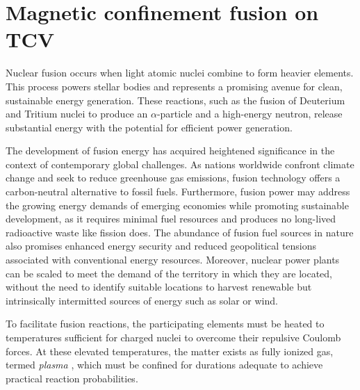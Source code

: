 \section{Magnetic confinement fusion on TCV}
\label{sec:tcv}
Nuclear fusion occurs when light atomic nuclei combine to form heavier elements. This process powers stellar bodies and represents a promising avenue for clean, sustainable energy generation. These reactions, such as the fusion of Deuterium and Tritium nuclei to produce an $\alpha$-particle and a high-energy neutron, release substantial energy with the potential for efficient power generation.

The development of fusion energy has acquired heightened significance in the context of contemporary global challenges. As nations worldwide confront climate change and seek to reduce greenhouse gas emissions, fusion technology offers a carbon-neutral alternative to fossil fuels. Furthermore, fusion power may address the growing energy demands of emerging economies while promoting sustainable development, as it requires minimal fuel resources and produces no long-lived radioactive waste like fission does. The abundance of fusion fuel sources in nature also promises enhanced energy security and reduced geopolitical tensions associated with conventional energy resources. Moreover, nuclear power plants can be scaled to meet the demand of the territory in which they are located, without the need to identify suitable locations to harvest renewable but intrinsically intermitted sources of energy such as solar or wind.

To facilitate fusion reactions, the participating elements must be heated to temperatures sufficient for charged nuclei to overcome their repulsive Coulomb forces. At these elevated temperatures, the matter exists as fully ionized gas, termed \emph{plasma} \cite{chen_introduction_2012}, which must be confined for durations adequate to achieve practical reaction probabilities.

